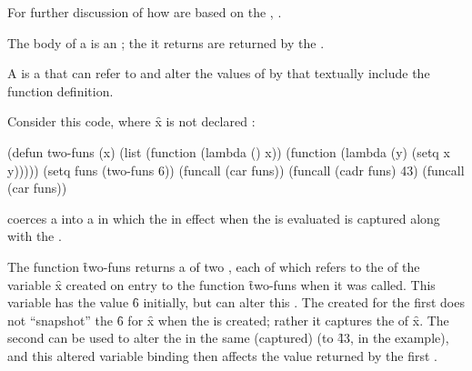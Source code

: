 For further discussion of how  are  
based on the , \seesection\LambdaLists.

The body of a  is an ;
the  it returns are returned by the .


\endsubsection%

 
A  is a  that can refer to and alter
the values of   by  
that textually include the function definition.
 
Consider this code, where \f{x} is not declared :
 
\code
 (defun two-funs (x)
   (list (function (lambda () x))
         (function (lambda (y) (setq x y)))))
 (setq funs (two-funs 6))
 (funcall (car funs)) 
 (funcall (cadr funs) 43) 
 (funcall (car funs)) 
\endcode

 coerces a 
 into a  in which the 
 in effect when the  is
evaluated is captured along with the .

The function \f{two-funs} returns a  of two 
, each of which refers to the  of the
variable \f{x} created on entry to the function \f{two-funs} when it
was called.
This variable has the value \f{6}
initially, but  can alter this .
The  created for the first 
 does not ``snapshot'' the  \f{6} for \f{x}
when the  is created; rather it captures the  of \f{x}.
The second  can be used to alter the  in the same (captured)
 (to \f{43}, in the example), and
this altered variable binding then affects the value returned by the first .

